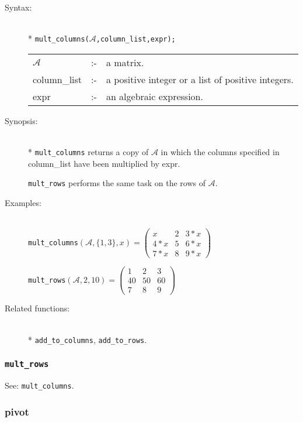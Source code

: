 \begin{description}
\item[Syntax:]\mbox{}\\*
\texttt{mult\_columns($\mathcal{A}$,column\_list,expr);}\\[2mm]
\begin{tabular}{l l l}
$\mathcal{A}$   &:-& a matrix. \\
column\_list &:-& a positive integer or a list of positive integers. \\
expr        &:-& an algebraic expression.
\end{tabular}

\item[Synopsis:]\mbox{}\\*
\texttt{mult\_columns} returns a copy of $\mathcal{A}$ in which
                the columns specified in column\_list have been
multiplied by expr.

\texttt{mult\_rows} performs the same task on the rows of $\mathcal{A}$.

\item[Examples:]\mbox{}\\
  \texttt{mult\_columns}\((\mathcal{A},\{1,3\},x)  =
  \begin{pmatrix} x & 2 & 3*x \\ 4*x & 5 & 6*x \\ 7*x & 8 & 9*x \end{pmatrix}\)

  \texttt{mult\_rows}\((\mathcal{A},2,10)  =
  \begin{pmatrix} 1 & 2 & 3 \\ 40 & 50 & 60 \\ 7 & 8 & 9 \end{pmatrix}\)

\item[Related functions:]\mbox{}\\*
\texttt{add\_to\_columns}, \texttt{add\_to\_rows}.
\end{description}


\subsubsection{\texttt{mult\_rows}}
\label{linalg:mult_rows}
See: \texttt{mult\_columns}.


\subsubsection{pivot}
\label{linalg:pivot}

